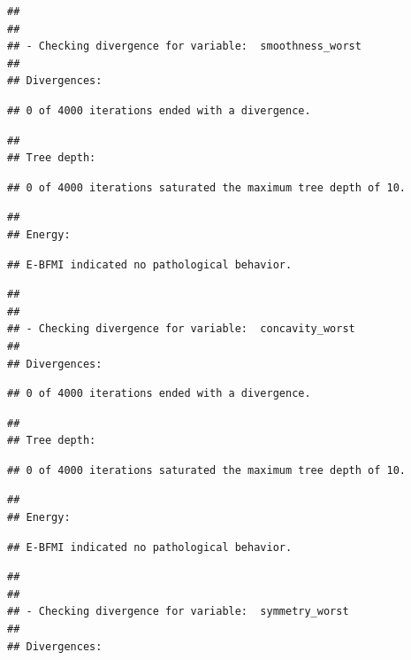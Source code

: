 \documentclass[
]{article}
\begin{document}
\begin{verbatim}
## 
## 
## - Checking divergence for variable:  smoothness_worst 
## 
## Divergences:
\end{verbatim}

\begin{verbatim}
## 0 of 4000 iterations ended with a divergence.
\end{verbatim}

\begin{verbatim}
## 
## Tree depth:
\end{verbatim}

\begin{verbatim}
## 0 of 4000 iterations saturated the maximum tree depth of 10.
\end{verbatim}

\begin{verbatim}
## 
## Energy:
\end{verbatim}

\begin{verbatim}
## E-BFMI indicated no pathological behavior.
\end{verbatim}

\begin{verbatim}
## 
## 
## - Checking divergence for variable:  concavity_worst 
## 
## Divergences:
\end{verbatim}

\begin{verbatim}
## 0 of 4000 iterations ended with a divergence.
\end{verbatim}

\begin{verbatim}
## 
## Tree depth:
\end{verbatim}

\begin{verbatim}
## 0 of 4000 iterations saturated the maximum tree depth of 10.
\end{verbatim}

\begin{verbatim}
## 
## Energy:
\end{verbatim}

\begin{verbatim}
## E-BFMI indicated no pathological behavior.
\end{verbatim}

\begin{verbatim}
## 
## 
## - Checking divergence for variable:  symmetry_worst 
## 
## Divergences:
\end{verbatim}
\end{document}
